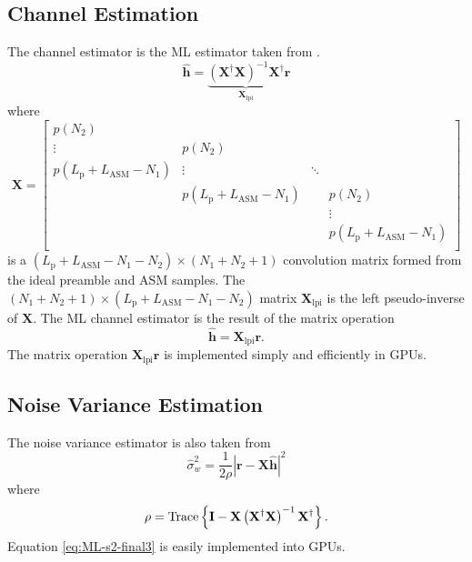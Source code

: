 \subsection{Channel Estimation}
\label{sec:channel_estimation}
The channel estimator is the ML estimator taken from \cite[eq. 8]{rice-afran-saquib-cole-rhodes-moazzami:2014}.
\begin{equation}
\hat{\mathbf{h}} = \underbrace{ \left( \mathbf{X}^\dag\mathbf{X} \right)^{-1} \mathbf{X}^\dag}_{\mathbf{X}_\text{lpi}}\mathbf{r}
\end{equation}
where 
\begin{equation}
\mathbf{X} = 
		\begin{bmatrix}
		p(N_2)							& 								& 		&  			\\
		\vdots 							& p(N_2)						& 		&  			\\
		p(L_\text{p}+L_\text{ASM}-N_1)	&\vdots							& \ddots&  			\\
										& p(L_\text{p}+L_\text{ASM}-N_1)&  		& p(N_2)  	\\
		 								&  								&  		& \vdots 	\\
		 								&  	   							&  		& p(L_\text{p}+L_\text{ASM}-N_1)\\
	\end{bmatrix}
\end{equation}
is a $(L_\text{p}+L_\text{ASM}-N_1-N_2)\times(N_1+N_2+1)$ convolution matrix formed from the ideal preamble and ASM samples.
The $(N_1+N_2+1)\times(L_\text{p}+L_\text{ASM}-N_1-N_2)$ matrix $\mathbf{X}_\text{lpi}$ is the left pseudo-inverse of $\mathbf{X}$.
The ML channel estimator is the result of the matrix operation
\begin{equation}
\hat{\mathbf{h}} = \mathbf{X}_\text{lpi} \mathbf{r}.
\end{equation}
The matrix operation $\mathbf{X}_\text{lpi} \mathbf{r}$ is implemented simply and efficiently in GPUs.


\subsection{Noise Variance Estimation}
\label{sec:noise_variance_estimation}
The noise variance estimator is also taken from \cite[eq. 9]{rice-afran-saquib-cole-rhodes-moazzami:2014}
\begin{equation}
	\hat{\sigma}_w^2 = \frac{1}{2\rho} \left| \mathbf{r}-\mathbf{X}\hat{\mathbf{h}}\right|^2
	\label{eq:ML-s2-final3}
\end{equation}
where
\begin{equation}
	\rho = {\rm Trace} \left\{ \mathbf{I} -  \mathbf{X}\left(\mathbf{X}^\dag\mathbf{X}\right)^{-1}\mathbf{X}^\dag \right\}.
\end{equation}
Equation \eqref{eq:ML-s2-final3} is easily implemented into GPUs.


